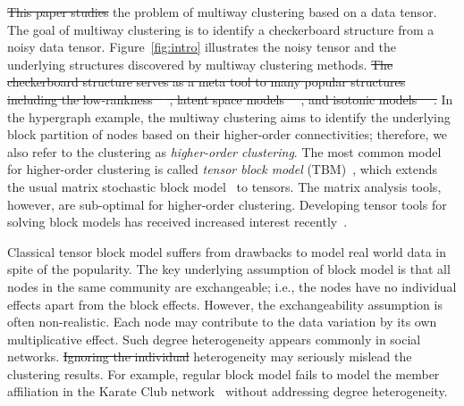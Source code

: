 \documentclass[lettersize,onecolumn,journal]{IEEEtran}
\theoremstyle{definition}
\theoremstyle{definition}
\def\fixme#1#2{\textbf{\color{red}[FIXME (#1): #2]}}
\providecommand{\DIFaddtex}[1]{{\protect\color{blue}\uwave{#1}}} %
\providecommand{\DIFdeltex}[1]{{\protect\color{red}\sout{#1}}}                      %
\providecommand{\DIFaddbegin}{} %
\providecommand{\DIFaddend}{} %
\providecommand{\DIFdelbegin}{} %
\providecommand{\DIFdelend}{} %
\providecommand{\DIFadd}[1]{\texorpdfstring{\DIFaddtex{#1}}{#1}} %
\providecommand{\DIFdel}[1]{\texorpdfstring{\DIFdeltex{#1}}{}} %
\newcommand{\DIFscaledelfig}{0.5}
\newlength{\DIFdelgraphicswidth} %
\newlength{\DIFdelgraphicsheight} %
\newcommand{\DIFaddincludegraphics}[2][]{{\color{blue}\fbox{\DIFOincludegraphics[#1]{#2}}}} %
\newcommand{\DIFdelincludegraphics}[2][]{%
\sbox{\DIFdelgraphicsbox}{\DIFOincludegraphics[#1]{#2}}%
\settoboxwidth{\DIFdelgraphicswidth}{\DIFdelgraphicsbox} %
\settoboxtotalheight{\DIFdelgraphicsheight}{\DIFdelgraphicsbox} %
\scalebox{\DIFscaledelfig}{%
\parbox[b]{\DIFdelgraphicswidth}{\usebox{\DIFdelgraphicsbox}\\[-\baselineskip] \rule{\DIFdelgraphicswidth}{0em}}\llap{\resizebox{\DIFdelgraphicswidth}{\DIFdelgraphicsheight}{%
\setlength{\unitlength}{\DIFdelgraphicswidth}%
\begin{picture}(1,1)%
\thicklines\linethickness{2pt} %
{\color[rgb]{1,0,0}\put(0,0){\framebox(1,1){}}}%
{\color[rgb]{1,0,0}\put(0,0){\line( 1,1){1}}}%
{\color[rgb]{1,0,0}\put(0,1){\line(1,-1){1}}}%
\end{picture}%
}\hspace*{3pt}}} %
} %
\DeclareRobustCommand{\DIFaddbegin}{\DIFOaddbegin \let\includegraphics\DIFaddincludegraphics} %
\DeclareRobustCommand{\DIFaddend}{\DIFOaddend \let\includegraphics\DIFOincludegraphics} %
\DeclareRobustCommand{\DIFdelbegin}{\DIFOdelbegin \let\includegraphics\DIFdelincludegraphics} %
\DeclareRobustCommand{\DIFdelend}{\DIFOaddend \let\includegraphics\DIFOincludegraphics} %
\begin{document}
\DIFdel{This paper studies }\DIFdelend \DIFaddbegin \DIFadd{We study }\DIFaddend the problem of multiway clustering based on a data tensor. The goal of multiway clustering is to identify a checkerboard structure from a noisy data tensor. Figure~\ref{fig:intro} illustrates the noisy tensor and the underlying \DIFaddbegin \DIFadd{checkerboard }\DIFaddend structures discovered by multiway clustering methods. \DIFdelbegin \DIFdel{The checkerboard structure serves as a meta tool to many popular structures including the low-rankness~\mbox{%
\citep{young2018universality}}\hspace{0pt}%
, latent space models~\mbox{%
\citep{wang2018learning}}\hspace{0pt}%
, and isotonic models~\mbox{%
\citep{pananjady2020isotonic}}\hspace{0pt}%
. }\DIFdelend In the hypergraph example, the multiway clustering aims to identify the underlying block partition of nodes based on their higher-order connectivities; therefore, we also refer to the clustering as \emph{higher-order clustering}. The most common model for higher-order clustering is called \emph{tensor block model} (TBM)~\citep{wang2019multiway}, which extends the usual matrix stochastic block model~\citep{abbe2017community} to tensors. %
The matrix analysis tools, however, are sub-optimal for higher-order clustering. Developing tensor tools for solving block models has received increased interest recently~\citep{ wang2019multiway,chi2020provable,han2020exact}. 


Classical tensor block model suffers from drawbacks to model real world data in spite of the popularity. The key underlying assumption of block model is that all nodes in the same community are exchangeable; i.e., the nodes have no individual effects apart from the block effects. However, the exchangeability assumption is often non-realistic. Each node may contribute to the data variation by its own multiplicative effect. Such degree heterogeneity appears commonly in social networks. \DIFdelbegin %
\DIFdel{Ignoring the individual }\DIFdelend \DIFaddbegin \DIFadd{Ignoring the degree }\DIFaddend heterogeneity may seriously mislead the clustering results. \DIFdelbegin %
\DIFdelend For example, regular block model fails to model \DIFdelbegin %
\DIFdelend the member affiliation in \DIFdelbegin %
\DIFdelend the Karate Club network~\citep{bickel2009nonparametric} without addressing %
degree heterogeneity. 
\end{document}
